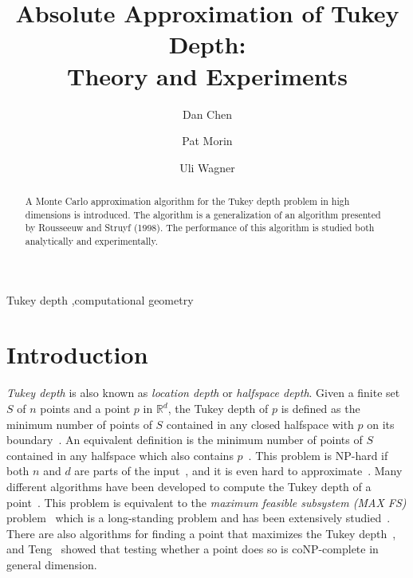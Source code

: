 \documentclass[preprint, 12pt]{elsarticle}
\begin{document}
\begin{frontmatter}

\title{Absolute Approximation of Tukey Depth:\\Theory and Experiments}

\author{Dan Chen}
\address{School of Computer Science, Carleton University}

\author{Pat Morin}
\address{School of Computer Science, Carleton University}

\author{Uli Wagner}
\address{Institut f\"ur Theoretische Informatik}

\begin{abstract}
  A Monte Carlo approximation algorithm for the Tukey depth problem in
  high dimensions is introduced. The algorithm is a generalization of
  an algorithm presented by Rousseeuw and Struyf (1998). The performance
  of this algorithm is studied both analytically and experimentally.
\end{abstract}

\begin{keyword}
 Tukey depth \sep computational geometry 
\end{keyword}

\end{frontmatter}

\section{Introduction}
\label{sec:intro}

\emph{Tukey depth} is also known as \emph{location depth} or \emph{halfspace depth}. Given a finite set $S$ of $n$ points and a point $p$ in $\mathbb{R}^{d}$, the Tukey depth of $p$ is defined as the minimum number of points of $S$ contained in any closed halfspace with $p$ on its boundary~\cite{Hodges,Tukey}. An equivalent definition is the minimum number of points of $S$ contained in any halfspace which also contains $p$~\cite{Bremner08}. This problem is NP-hard if both $n$ and $d$ are parts of the input~\cite{Johnson}, and it is even hard to approximate~\cite{Amaldi95}. Many different algorithms have been developed to compute the Tukey depth of a point~\cite{Bremner06, Bremner08, Rousseeuw98}. This problem is equivalent to the \emph{maximum feasible subsystem (MAX FS)} problem~\cite{Chen07} which is a long-standing problem and has been extensively studied~\cite[Chapter 7]{Chinneck08}. There are also algorithms for finding a point that maximizes the Tukey depth~\cite{Chan04, Langerman03, Matousek92}, and Teng~\cite{Teng91} showed that testing whether a point does so is coNP-complete in general dimension.
\end{document}
